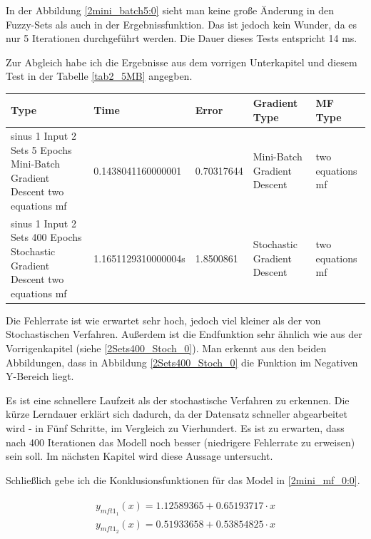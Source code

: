 {In der Abbildung \ref{2mini_batch5:0} sieht man keine große Änderung in den Fuzzy-Sets als auch in der Ergebnissfunktion. Das ist jedoch kein Wunder, da es nur 5 Iterationen durchgeführt werden. Die Dauer dieses Tests entspricht 14 ms.

Zur Abgleich habe ich die Ergebnisse aus dem vorrigen Unterkapitel und diesem Test in der Tabelle \ref{tab2_5MB} angegben.
\begin{center}
	\begin{minipage}{\textwidth}
	\begin{tabular}{ | p{3cm} | l | l | p{3cm} | p{3cm} |}
		\hline
		Type & Time & Error & Gradient Type & MF Type \\ \hline
		sinus 1 Input 2 Sets 5 Epochs Mini-Batch Gradient Descent two equations mf&0.1438041160000001&0.70317644&Mini-Batch Gradient Descent&two equations mf \\ \hline
		sinus 1 Input 2 Sets 400 Epochs Stochastic Gradient Descent two equations mf&1.1651129310000004s&1.8500861&Stochastic Gradient Descent&two equations mf
		\\ \hline
	\end{tabular} 
\label{tab2_5MB}
\end{minipage}
\end{center}

Die Fehlerrate ist wie erwartet sehr hoch, jedoch viel kleiner als der von Stochastischen Verfahren. Außerdem ist die Endfunktion sehr ähnlich wie aus der Vorrigenkapitel (siehe \ref{2Sets400_Stoch_0}). Man erkennt aus den beiden Abbildungen, dass in Abbildung \ref{2Sets400_Stoch_0} die Funktion im Negativen Y-Bereich liegt.%

Es ist eine schnellere Laufzeit als der stochastische Verfahren zu erkennen. Die kürze Lerndauer erklärt sich dadurch, da der Datensatz schneller abgearbeitet wird - in Fünf Schritte, im Vergleich zu Vierhundert. Es ist zu erwarten, dass nach 400 Iterationen das Modell noch besser (niedrigere Fehlerrate zu erweisen) sein soll. Im nächsten Kapitel wird diese Aussage untersucht.

Schließlich gebe ich die Konklusionsfunktionen für das Model in \ref{2mini_mf_0:0}.


\begin{align}
\begin{split}\label{2mini_mf_0:0}
y_{mft1_1}(x) = 1.12589365 + 0.65193717\cdot x \\
y_{mft1_2}(x) = 0.51933658 + 0.53854825\cdot x
\end{split}
\end{align}

}
